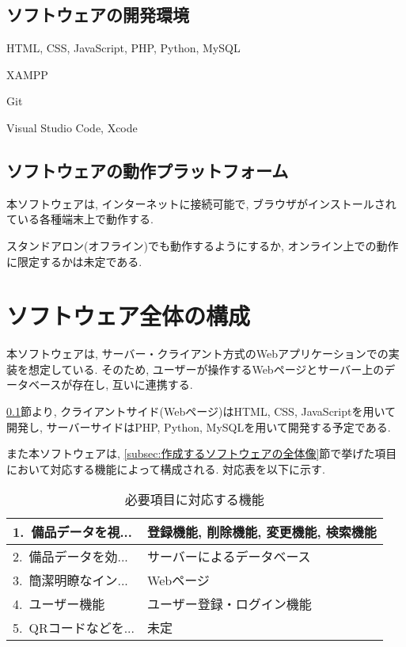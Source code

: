 \documentclass[11ptm]{jsarticle}
\begin{document}
\subsection{ソフトウェアの開発環境}
\label{subsec:ソフトウェアの開発環境}
\begin{description}[labelwidth=9em]
  \item[使用言語] HTML, CSS, JavaScript, PHP, Python, MySQL
  \item[使用フレームワーク] XAMPP
  \item[使用ミドルウェア] Git
  \item[使用開発環境] Visual Studio Code, Xcode
\end{description}

\subsection{ソフトウェアの動作プラットフォーム}
\label{subsec:ソフトウェアの動作プラットフォーム}
本ソフトウェアは, インターネットに接続可能で, ブラウザがインストールされている各種端末上で動作する. \par
スタンドアロン(オフライン)でも動作するようにするか, オンライン上での動作に限定するかは未定である. 


\newpage
\section{ソフトウェア全体の構成}
\label{sec:ソフトウェア全体の構成}
本ソフトウェアは, サーバー・クライアント方式のWebアプリケーションでの実装を想定している. そのため, ユーザーが操作するWebページとサーバー上のデータベースが存在し, 互いに連携する. \par
\ref{subsec:ソフトウェアの開発環境}節より, クライアントサイド(Webページ)はHTML, CSS, JavaScriptを用いて開発し, サーバーサイドはPHP, Python, MySQLを用いて開発する予定である. \par
また本ソフトウェアは, \ref{subsec:作成するソフトウェアの全体像}節で挙げた項目において対応する機能によって構成される. 対応表を以下に示す. 
\begin{table}[h]
  \caption{必要項目に対応する機能}
  \label{tb:必要項目に対応する機能}
  \centering
  \begin{tabularx}{\linewidth}{l|l}
    1.\ 備品データを視... & 登録機能, 削除機能, 変更機能, 検索機能 \\
    \hline
    2.\ 備品データを効... & サーバーによるデータベース \\
    \hline
    3.\ 簡潔明瞭なイン... & Webページ \\
    \hline
    4.\ ユーザー機能 & ユーザー登録・ログイン機能 \\
    \hline
    5.\ QRコードなどを... & 未定 \\
  \end{tabularx}
\end{table}
\end{document}
